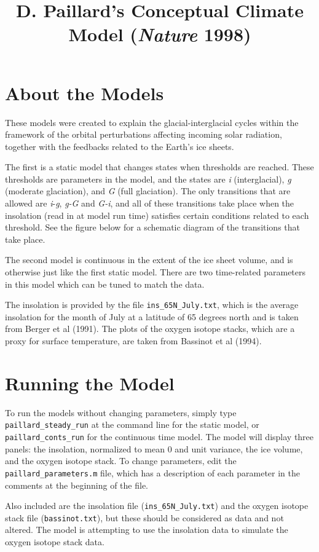 \documentclass[11pt]{amsart}
\title{D. Paillard's Conceptual Climate Model (\emph{Nature} 1998)}
\author{ }
\begin{document}
\maketitle
\section{About the Models}
These models were created to explain the glacial-interglacial cycles within the framework of the orbital perturbations affecting incoming solar radiation, together with the feedbacks related to the Earth's ice sheets.  

The first is a static model that changes states when thresholds are reached.  These thresholds are parameters in the model, and the states are \emph{i} (interglacial), \emph{g} (moderate glaciation), and \emph{G} (full glaciation).  The only transitions that are allowed are \emph{i}-\emph{g}, \emph{g-G} and \emph{G-i}, and all of these transitions take place when the insolation (read in at model run time) satisfies certain conditions related to each threshold.  See the figure below for a schematic diagram of the transitions that take place.

The second model is continuous in the extent of the ice sheet volume, and is otherwise just like the first static model. There are two time-related parameters in this model which can be tuned to match the data.

The insolation is provided by the file \texttt{ins\_65N\_July.txt}, which is the average insolation for the month of July at a latitude of 65 degrees north and is taken from Berger et al (1991).  The plots of the oxygen isotope stacks, which are a proxy for surface temperature, are taken from Bassinot et al (1994).

\section{Running the Model}
To run the models without changing parameters, simply type \texttt{paillard\_steady\_run} at the command line for the static model, or \texttt{paillard\_conts\_run} for the continuous time model.  The model will display three panels:  the insolation, normalized to mean 0 and unit variance, the ice volume, and the oxygen isotope stack.  To change parameters, edit the \texttt{paillard\_parameters.m} file, which has a description of each parameter in the comments at the beginning of the file.

Also included are the insolation file (\texttt{ins\_65N\_July.txt}) and the oxygen isotope stack file (\texttt{bassinot.txt}), but these should be considered as data and not altered.  The model is attempting to use the insolation data to simulate the oxygen isotope stack data.
\end{document}
